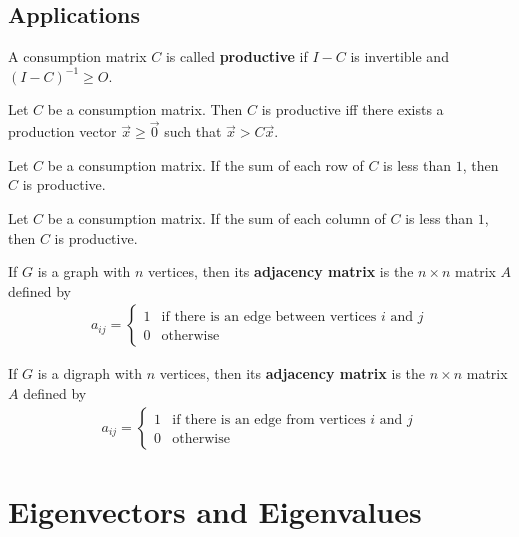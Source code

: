 \documentclass{article}
\begin{document}
\subsection{Applications}
\begin{definition}
	A consumption matrix $C$ is called \textbf{productive} if $I-C$ is invertible and $(I-C)^{-1}\geq O$.
\end{definition}
\begin{theorem}
	Let $C$ be a consumption matrix. Then $C$ is productive iff there exists a production vector $\vec x \geq \vec 0$ such that $\vec x > C\vec x$.
\end{theorem}
\begin{theorem}
	Let $C$ be a consumption matrix. If the sum of each row of $C$ is less than $1$, then $C$ is productive.
\end{theorem}
\begin{theorem}
	Let $C$ be a consumption matrix. If the sum of each column of $C$ is less than $1$, then $C$ is productive.
\end{theorem}
\begin{definition}
	If $G$ is a graph with $n$ vertices, then its \textbf{adjacency matrix} is the $n\times n$ matrix $A$ defined by
	\begin{gather*}
		a_{ij} = \begin{cases}
			1 & \text{if there is an edge between vertices $i$ and $j$} \\
			0 & \text{otherwise}
		\end{cases}
	\end{gather*}
\end{definition}
\begin{definition}
	If $G$ is a digraph with $n$ vertices, then its \textbf{adjacency matrix} is the $n\times n$ matrix $A$ defined by
	\begin{gather*}
		a_{ij} = \begin{cases}
			1 & \text{if there is an edge from vertices $i$ and $j$} \\
			0 & \text{otherwise}
		\end{cases}
	\end{gather*}
\end{definition}
\section{Eigenvectors and Eigenvalues}
\end{document}

